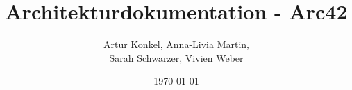%
%

\newcommand{\fullname}{Artur Konkel, Anna-Livia Martin,\\ Sarah Schwarzer, Vivien Weber}
\newcommand{\fakultaet}{Medieninformatik}

\newcommand{\titel}{Architekturdokumentation - Arc42}

\newcommand{\abgabedatum}{08.07.2024}
\newcommand{\aktstand}{17.06.2024}
\newcommand{\version}{1.16}

\title{Architekturdokumentation - Arc42}
\author{\fullname}
\date{\today}